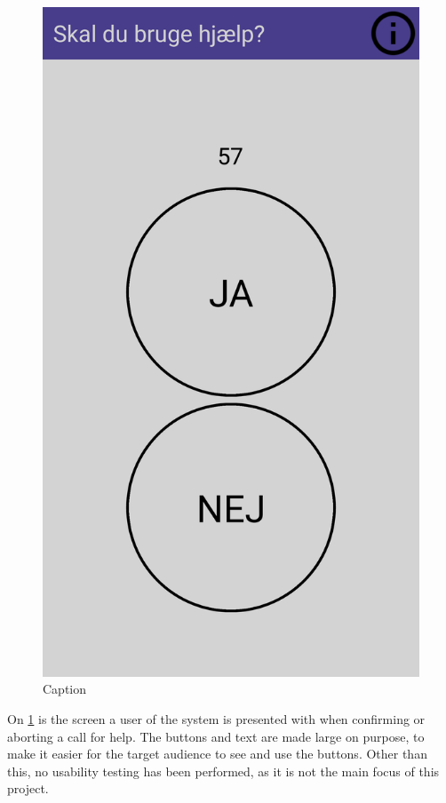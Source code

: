 \begin{figure}
    \centering
    \includegraphics[scale=0.1]{Figures/usabapp.png}
    \caption{Caption}
    \label{fig:usabapp}
\end{figure}


On \ref{fig:usabapp} is the screen a user of the system is presented with when confirming or aborting a call for help. The buttons and text are made large on purpose, to make it easier for the target audience to see and use the buttons. Other than this, no usability testing has been performed, as it is not the main focus of this project.